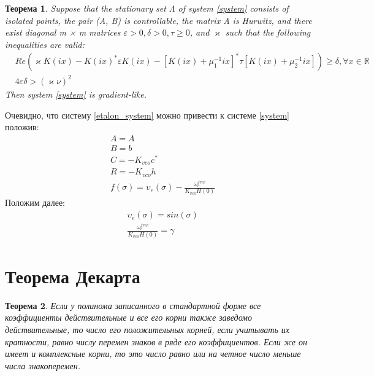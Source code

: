 \documentclass[a4paper,14pt]{extarticle} %
\newtheorem{theorem}{Теорема}
\begin{document}
\begin{theorem}\label{th1}
Suppose that the stationary set $\Lambda$ of system \eqref{system} consists of isolated points, the pair (A, B) is controllable, the matrix A is Hurwitz, and there exist diagonal m × m matrices $\varepsilon > 0, \delta > 0, \tau \geq 0$, and $\varkappa$ such that the following inequalities are valid:
 \begin{equation}
 \begin{aligned}
&Re(\varkappa K(ix)-K(ix)^*\varepsilon K(ix)-[K(ix)+\mu_1^{-1}ix]^*\tau[K(ix)+\mu_2^{-1}ix])\geq\delta, \forall x \in \mathbb{R}\\
&4\varepsilon\delta > (\varkappa\nu)^2
 \end{aligned}
\end{equation}
Then system \eqref{system} is gradient-like.
\end{theorem}

Очевидно, что систему \eqref{etalon_system} можно привести к системе  \eqref{system} положив: 
 \begin{equation}
 \begin{aligned}
&A=A\\
&B = b\\
&C = -K_{vco}c^*\\
&R = -K_{vco}h\\
&f(\sigma) = \upsilon_e(\sigma) - \frac{\omega_e^{free}}{K_{vco}H(0)}
\end{aligned}
\end{equation}
Положим далее:
 \begin{equation}
 \begin{aligned}
&\upsilon_e(\sigma) =  sin(\sigma)\\
&\frac{\omega_e^{free}}{K_{vco}H(0)} = \gamma
\end{aligned}
\end{equation}
\section{Теорема Декарта}
\begin{theorem}
Если у полинома записанного в стандартной форме все коэффициенты действительные и все его корни также заведомо действительные, то число его положительных корней, если учитывать их кратности, равно числу перемен знаков в ряде его коэффициентов. Если же он имеет и комплексные корни, то это число равно или на четное число меньше числа знакоперемен.
\end{theorem}
\end{document}
